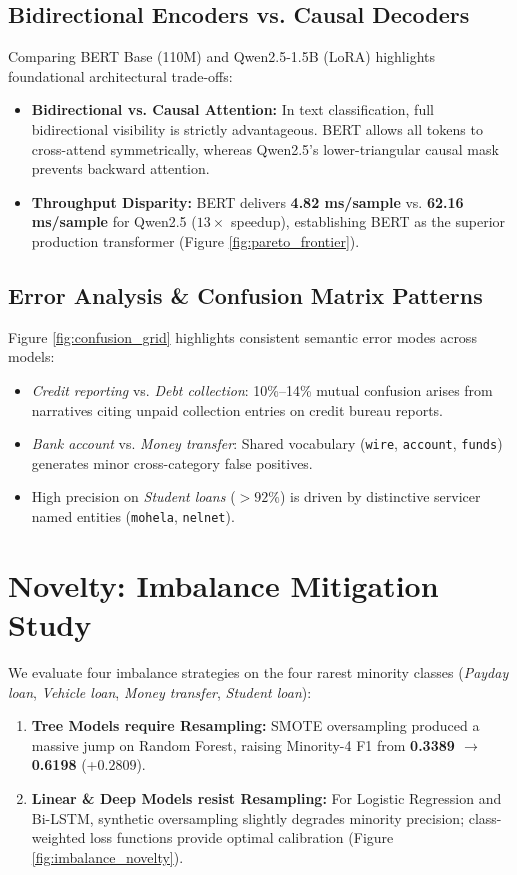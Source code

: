 \documentclass[11pt,a4paper,twocolumn]{article}
\begin{document}
\subsection{Bidirectional Encoders vs. Causal Decoders}
Comparing BERT Base (110M) and Qwen2.5-1.5B (LoRA) highlights foundational architectural trade-offs:
\begin{itemize}
    \item \textbf{Bidirectional vs. Causal Attention:} In text classification, full bidirectional visibility is strictly advantageous. BERT allows all tokens to cross-attend symmetrically, whereas Qwen2.5's lower-triangular causal mask prevents backward attention.
    \item \textbf{Throughput Disparity:} BERT delivers \textbf{4.82 ms/sample} vs. \textbf{62.16 ms/sample} for Qwen2.5 ($13\times$ speedup), establishing BERT as the superior production transformer (Figure \ref{fig:pareto_frontier}).
\end{itemize}

\subsection{Error Analysis \& Confusion Matrix Patterns}
Figure \ref{fig:confusion_grid} highlights consistent semantic error modes across models:
\begin{itemize}
    \item \textit{Credit reporting} vs. \textit{Debt collection}: 10\%--14\% mutual confusion arises from narratives citing unpaid collection entries on credit bureau reports.
    \item \textit{Bank account} vs. \textit{Money transfer}: Shared vocabulary (\texttt{wire}, \texttt{account}, \texttt{funds}) generates minor cross-category false positives.
    \item High precision on \textit{Student loans} ($>92\%$) is driven by distinctive servicer named entities (\texttt{mohela}, \texttt{nelnet}).
\end{itemize}

\section{Novelty: Imbalance Mitigation Study}
We evaluate four imbalance strategies on the four rarest minority classes (\textit{Payday loan}, \textit{Vehicle loan}, \textit{Money transfer}, \textit{Student loan}):
\begin{enumerate}
    \item \textbf{Tree Models require Resampling:} SMOTE oversampling produced a massive jump on Random Forest, raising Minority-4 F1 from \textbf{0.3389 $\to$ 0.6198} (+$0.2809$).
    \item \textbf{Linear \& Deep Models resist Resampling:} For Logistic Regression and Bi-LSTM, synthetic oversampling slightly degrades minority precision; class-weighted loss functions provide optimal calibration (Figure \ref{fig:imbalance_novelty}).
\end{enumerate}
\end{document}
